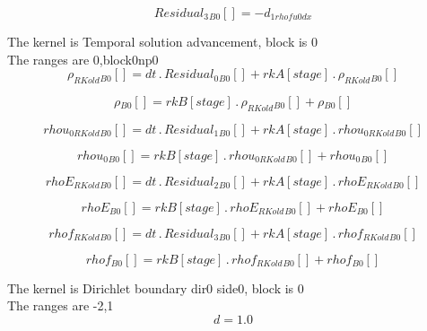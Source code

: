 \documentclass{article}
\begin{document}
\begin{dmath}{Residual_{3}{_{B0}}}[{}] = - d_{1 rhofu0 dx}\end{dmath}

\noindent The kernel is Temporal solution advancement, block is 0\\\noindent The ranges are 0,block0np0\\\begin{dmath}{\rho_{RKold}{_{B0}}}[{}] = dt \,.\, {Residual_{0}{_{B0}}}[{}] + {rkA}[{stage}] \,.\, {\rho_{RKold}{_{B0}}}[{}]\end{dmath}

\begin{dmath}{\rho{_{B0}}}[{}] = {rkB}[{stage}] \,.\, {\rho_{RKold}{_{B0}}}[{}] + {\rho{_{B0}}}[{}]\end{dmath}

\begin{dmath}{rhou_{0 RKold}{_{B0}}}[{}] = dt \,.\, {Residual_{1}{_{B0}}}[{}] + {rkA}[{stage}] \,.\, {rhou_{0 RKold}{_{B0}}}[{}]\end{dmath}

\begin{dmath}{rhou_{0}{_{B0}}}[{}] = {rkB}[{stage}] \,.\, {rhou_{0 RKold}{_{B0}}}[{}] + {rhou_{0}{_{B0}}}[{}]\end{dmath}

\begin{dmath}{rhoE_{RKold}{_{B0}}}[{}] = dt \,.\, {Residual_{2}{_{B0}}}[{}] + {rkA}[{stage}] \,.\, {rhoE_{RKold}{_{B0}}}[{}]\end{dmath}

\begin{dmath}{rhoE{_{B0}}}[{}] = {rkB}[{stage}] \,.\, {rhoE_{RKold}{_{B0}}}[{}] + {rhoE{_{B0}}}[{}]\end{dmath}

\begin{dmath}{rhof_{RKold}{_{B0}}}[{}] = dt \,.\, {Residual_{3}{_{B0}}}[{}] + {rkA}[{stage}] \,.\, {rhof_{RKold}{_{B0}}}[{}]\end{dmath}

\begin{dmath}{rhof{_{B0}}}[{}] = {rkB}[{stage}] \,.\, {rhof_{RKold}{_{B0}}}[{}] + {rhof{_{B0}}}[{}]\end{dmath}

\noindent The kernel is Dirichlet boundary dir0 side0, block is 0\\\noindent The ranges are -2,1\\\begin{dmath}d = 1.0\end{dmath}
\end{document}
